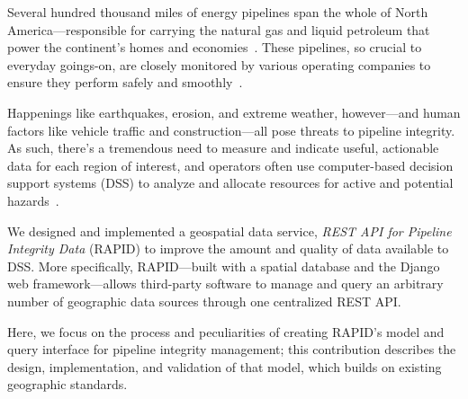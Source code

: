 Several hundred thousand miles of energy pipelines span the whole of North America---responsible for carrying the natural gas and liquid petroleum that power the continent's homes and economies~\cite{PHMSA}. These pipelines, so crucial to everyday goings-on, are closely monitored by various operating companies to ensure they perform safely and smoothly~\cite{PHMSA2013}. 

Happenings like earthquakes, erosion, and extreme weather, however---and human factors like vehicle traffic and construction---all pose threats to pipeline integrity. As such, there's a tremendous need to measure and indicate useful, actionable data for each region of interest, and operators often use computer-based decision support systems (DSS) to analyze and allocate resources for active and potential hazards~\cite{PHMSA2013,MichaelBakerJr.2008,Chastain,Dunning2013}.

We designed and implemented a geospatial data service, \textit{REST API for Pipeline Integrity Data} (RAPID) to improve the amount and quality of data available to DSS. More specifically, RAPID---built with a spatial database and the Django web framework---allows third-party software to manage and query an arbitrary number of geographic data sources through one centralized REST API.

Here, we focus on the process and peculiarities of creating RAPID's model and query interface for pipeline integrity management; this contribution describes the design, implementation, and validation of that model, which builds on existing geographic standards.
